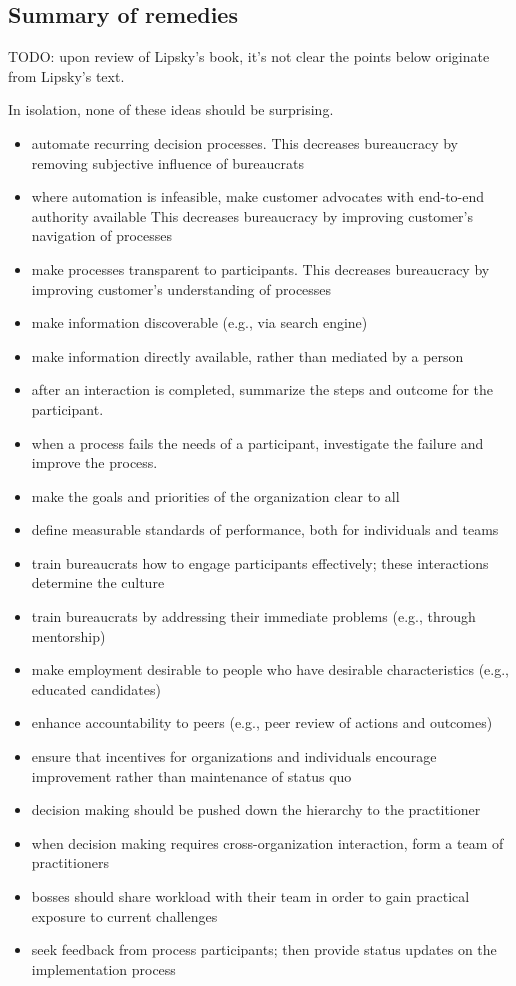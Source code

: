 \subsection*{Summary of remedies}

TODO: upon review of Lipsky's book, it's not clear the points below originate from Lipsky's text.

In isolation, none of these ideas should be surprising.
\begin{itemize}
    \item automate recurring decision processes. This decreases bureaucracy by removing subjective influence of bureaucrats
\item where automation is infeasible, make customer advocates with end-to-end authority available
This decreases bureaucracy by improving customer's navigation of processes
\item make processes transparent to participants. 
This decreases bureaucracy by improving customer's understanding of processes
\item make information discoverable (e.g., via search engine) 
\item make information directly available, rather than mediated by a person
\item after an interaction is completed, summarize the steps and outcome for the participant. 
\item when a process fails the needs of a participant, investigate the failure and improve the process.
\item make the goals and priorities of the organization clear to all
\item define measurable standards of performance, both for individuals and teams
\item train bureaucrats how to engage participants effectively; these interactions determine the culture
\item train bureaucrats by addressing their immediate problems (e.g., through mentorship)
\item make employment desirable to people who have desirable characteristics (e.g., educated candidates)
\item enhance accountability to peers (e.g., peer review of actions and outcomes)
\item ensure that incentives for organizations and individuals encourage improvement rather than maintenance of status quo
\item decision making should be pushed down the hierarchy to the practitioner
\item when decision making requires cross-organization interaction, form a team of practitioners
\item bosses should share workload with their team in order to gain practical exposure to current challenges
\item seek feedback from process participants; then provide status updates on the implementation process
\end{itemize}

